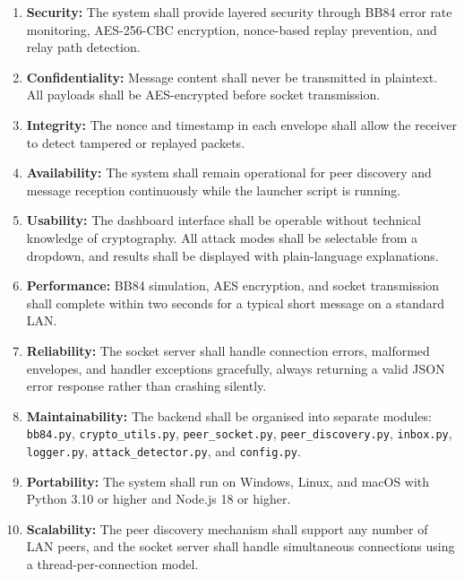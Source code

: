 \begin{enumerate}
    \item \textbf{Security:} The system shall provide layered security through BB84 error rate monitoring, AES-256-CBC encryption, nonce-based replay prevention, and relay path detection.

    \item \textbf{Confidentiality:} Message content shall never be transmitted in plaintext. All payloads shall be AES-encrypted before socket transmission.

    \item \textbf{Integrity:} The nonce and timestamp in each envelope shall allow the receiver to detect tampered or replayed packets.

    \item \textbf{Availability:} The system shall remain operational for peer discovery and message reception continuously while the launcher script is running.

    \item \textbf{Usability:} The dashboard interface shall be operable without technical knowledge of cryptography. All attack modes shall be selectable from a dropdown, and results shall be displayed with plain-language explanations.

    \item \textbf{Performance:} BB84 simulation, AES encryption, and socket transmission shall complete within two seconds for a typical short message on a standard LAN.

    \item \textbf{Reliability:} The socket server shall handle connection errors, malformed envelopes, and handler exceptions gracefully, always returning a valid JSON error response rather than crashing silently.

    \item \textbf{Maintainability:} The backend shall be organised into separate modules: \texttt{bb84.py}, \texttt{crypto\_utils.py}, \texttt{peer\_socket.py}, \texttt{peer\_discovery.py}, \texttt{inbox.py}, \texttt{logger.py}, \texttt{attack\_detector.py}, and \texttt{config.py}.

    \item \textbf{Portability:} The system shall run on Windows, Linux, and macOS with Python 3.10 or higher and Node.js 18 or higher.

    \item \textbf{Scalability:} The peer discovery mechanism shall support any number of LAN peers, and the socket server shall handle simultaneous connections using a thread-per-connection model.
\end{enumerate}

